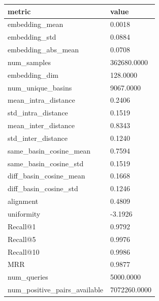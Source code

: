 \begin{tabular}{ll}
\toprule
metric & value \\
\midrule
embedding_mean & 0.0018 \\
embedding_std & 0.0884 \\
embedding_abs_mean & 0.0708 \\
num_samples & 362680.0000 \\
embedding_dim & 128.0000 \\
num_unique_basins & 9067.0000 \\
mean_intra_distance & 0.2406 \\
std_intra_distance & 0.1519 \\
mean_inter_distance & 0.8343 \\
std_inter_distance & 0.1240 \\
same_basin_cosine_mean & 0.7594 \\
same_basin_cosine_std & 0.1519 \\
diff_basin_cosine_mean & 0.1668 \\
diff_basin_cosine_std & 0.1246 \\
alignment & 0.4809 \\
uniformity & -3.1926 \\
Recall@1 & 0.9792 \\
Recall@5 & 0.9976 \\
Recall@10 & 0.9986 \\
MRR & 0.9877 \\
num_queries & 5000.0000 \\
num_positive_pairs_available & 7072260.0000 \\
\bottomrule
\end{tabular}
